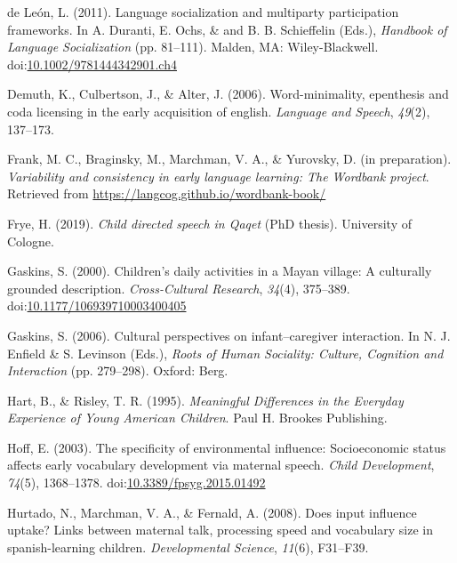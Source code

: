 \documentclass[,man,floatsintext]{apa6}
\begin{document}
\hypertarget{ref-deleon2011language}{}
de León, L. (2011). Language socialization and multiparty participation
frameworks. In A. Duranti, E. Ochs, \& and B. B. Schieffelin (Eds.),
\emph{Handbook of Language Socialization} (pp. 81--111). Malden, MA:
Wiley-Blackwell.
doi:\href{https://doi.org/10.1002/9781444342901.ch4}{10.1002/9781444342901.ch4}

\hypertarget{ref-demuth2006word}{}
Demuth, K., Culbertson, J., \& Alter, J. (2006). Word-minimality,
epenthesis and coda licensing in the early acquisition of english.
\emph{Language and Speech}, \emph{49}(2), 137--173.

\hypertarget{ref-frankIPvariability}{}
Frank, M. C., Braginsky, M., Marchman, V. A., \& Yurovsky, D. (in
preparation). \emph{Variability and consistency in early language
learning: The Wordbank project}. Retrieved from
\url{https://langcog.github.io/wordbank-book/}

\hypertarget{ref-frye2019thesis}{}
Frye, H. (2019). \emph{Child directed speech in Qaqet} (PhD thesis).
University of Cologne.

\hypertarget{ref-gaskins2000childrens}{}
Gaskins, S. (2000). Children's daily activities in a Mayan village: A
culturally grounded description. \emph{Cross-Cultural Research},
\emph{34}(4), 375--389.
doi:\href{https://doi.org/10.1177/106939710003400405}{10.1177/106939710003400405}

\hypertarget{ref-gaskins2006cultural}{}
Gaskins, S. (2006). Cultural perspectives on infant--caregiver
interaction. In N. J. Enfield \& S. Levinson (Eds.), \emph{Roots of
Human Sociality: Culture, Cognition and Interaction} (pp. 279--298).
Oxford: Berg.

\hypertarget{ref-hart1995meaningful}{}
Hart, B., \& Risley, T. R. (1995). \emph{Meaningful Differences in the
Everyday Experience of Young American Children}. Paul H. Brookes
Publishing.

\hypertarget{ref-hoff2003specificity}{}
Hoff, E. (2003). The specificity of environmental influence:
Socioeconomic status affects early vocabulary development via maternal
speech. \emph{Child Development}, \emph{74}(5), 1368--1378.
doi:\href{https://doi.org/10.3389/fpsyg.2015.01492}{10.3389/fpsyg.2015.01492}

\hypertarget{ref-hurtado2008does}{}
Hurtado, N., Marchman, V. A., \& Fernald, A. (2008). Does input
influence uptake? Links between maternal talk, processing speed and
vocabulary size in spanish-learning children. \emph{Developmental
Science}, \emph{11}(6), F31--F39.
\end{document}
